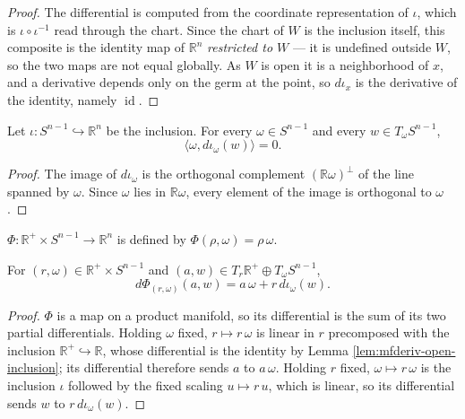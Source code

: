 \begin{proof}
\leanok
The differential is computed from the coordinate representation of $\iota$, which is $\iota \circ \iota^{-1}$ read through the chart. Since the chart of $W$ is the inclusion itself, this composite is the identity map of $\mathbb{R}^n$ \emph{restricted to $W$} — it is undefined outside $W$, so the two maps are not equal globally. As $W$ is open it is a neighborhood of $x$, and a derivative depends only on the germ at the point, so $d\iota_x$ is the derivative of the identity, namely $\operatorname{id}$.
\end{proof}

\begin{lemma}
\label{lem:sphere-tangent-orthogonal-radius}
\leanok
{}
Let $\iota : S^{n-1} \hookrightarrow \mathbb{R}^n$ be the inclusion. For every $\omega \in S^{n-1}$ and every $w \in T_\omega S^{n-1}$,
\[
\langle \omega, d\iota_\omega(w)\rangle = 0.
\]
\end{lemma}

\begin{proof}
\leanok
The image of $d\iota_\omega$ is the orthogonal complement $(\mathbb{R}\omega)^\perp$ of the line spanned by $\omega$. Since $\omega$ lies in $\mathbb{R}\omega$, every element of the image is orthogonal to $\omega$.
\end{proof}

\begin{definition}
\label{def:polar-map}
\leanok
{}
$\Phi : \mathbb{R}^+ \times S^{n-1} \to \mathbb{R}^n$ is defined by $\Phi(\rho, \omega) = \rho\,\omega$.
\end{definition}

\begin{lemma}
\label{lem:mfderiv-polar-map}
\leanok
{}
For $(r, \omega) \in \mathbb{R}^+ \times S^{n-1}$ and $(a, w) \in T_r\mathbb{R}^+ \oplus T_\omega S^{n-1}$,
\[
d\Phi_{(r,\omega)}(a, w) = a\,\omega + r\,d\iota_\omega(w).
\]
\end{lemma}

\begin{proof}
\leanok
$\Phi$ is a map on a product manifold, so its differential is the sum of its two partial differentials. Holding $\omega$ fixed, $r \mapsto r\,\omega$ is linear in $r$ precomposed with the inclusion $\mathbb{R}^+ \hookrightarrow \mathbb{R}$, whose differential is the identity by Lemma \ref{lem:mfderiv-open-inclusion}; its differential therefore sends $a$ to $a\,\omega$. Holding $r$ fixed, $\omega \mapsto r\,\omega$ is the inclusion $\iota$ followed by the fixed scaling $u \mapsto r\,u$, which is linear, so its differential sends $w$ to $r\,d\iota_\omega(w)$.
\end{proof}

